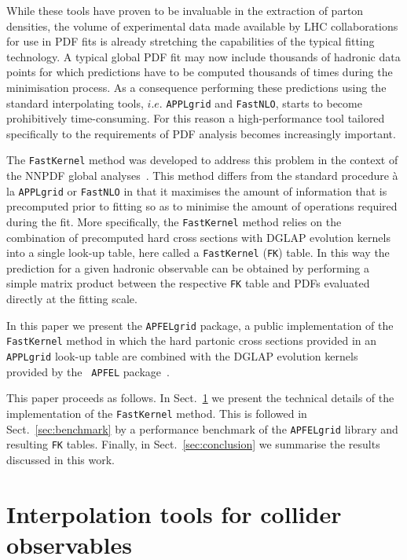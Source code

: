 \documentclass[preprint,12pt]{elsarticle}
\begin{document}
While these tools have proven to be invaluable in the extraction
of parton densities, the volume of experimental data made available by
LHC collaborations for use in PDF fits is already stretching the
capabilities of the typical fitting technology. A typical
global PDF fit may now include thousands of hadronic data points for which
predictions have to be computed thousands of times during the
minimisation process. As a consequence performing these predictions
using the standard interpolating tools, $i.e.$
{\tt APPLgrid} and {\tt FastNLO}, starts to become prohibitively time-consuming.
For this reason a high-performance tool tailored specifically to the requirements of PDF analysis becomes increasingly
important.

The {\tt FastKernel} method was developed to
address this problem in the context of the NNPDF global analyses~\cite{Ball:2010de,Ball:2014uwa}. This method differs from the standard procedure
\`{a} la {\tt APPLgrid} or {\tt FastNLO} in that it maximises the
amount of information that is precomputed prior to fitting so as to
minimise the amount of operations required during the
fit. More specifically, the {\tt FastKernel} method relies on the
combination of precomputed hard cross sections with DGLAP evolution
kernels into a single look-up table, here called
a {\tt FastKernel} ({\tt FK}) table. In this way the prediction
for a given hadronic observable can be obtained by performing a simple matrix
product between the respective {\tt FK} table and PDFs evaluated directly at the fitting scale.

In this paper we present the {\tt APFELgrid} package, a public
implementation of the {\tt FastKernel} method in which the hard
partonic cross sections provided in an {\tt APPLgrid} look-up table
are combined with the DGLAP evolution kernels provided by the {\tt
  APFEL}
package~\cite{Bertone:2013vaa}.

This paper proceeds as follows. In
Sect.~\ref{sec:FastKernel} we present the technical details of the
implementation of the {\tt FastKernel} method. This is followed in
Sect.~\ref{sec:benchmark} by a performance benchmark of the
{\tt APFELgrid} library and resulting {\tt FK} tables. Finally, in
Sect.~\ref{sec:conclusion} we summarise the results discussed in this
work.

\section{Interpolation tools for collider observables}\label{sec:FastKernel}
\end{document}
